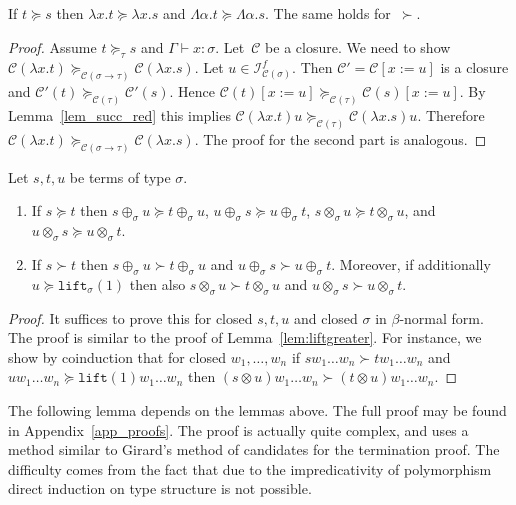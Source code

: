 \documentclass[a4paper,UKenglish,cleveref,autoref,numberwithinsect]{lipics-v2019}
\theoremstyle{definition}
\newcommand{\Iterms}{\mathcal{I}}
\newcommand{\arrtype}{\rightarrow}
\newcommand{\subst}[2]{#1:=#2}
\newcommand{\abs}[2]{\lambda #1.#2}
\newcommand{\tabs}[2]{\Lambda #1.#2}
\newcommand{\lift}{\mathtt{lift}}
\newcommand{\cl}{\mathcal{C}}
\newcommand{\proves}{\vdash}
\begin{document}
\begin{lemma}\label{lem_abs_succ}
  If $t \succeq s$ then $\abs{x}{t} \succeq \abs{x}{s}$ and
  $\tabs{\alpha}{t} \succeq \tabs{\alpha}{s}$. The same holds
  for~$\succ$.
\end{lemma}

\begin{proof}
  Assume $t \succeq_\tau s$ and $\Gamma \proves x : \sigma$. Let~$\cl$
  be a closure. We need to show $\cl(\abs{x}{t})
  \succeq_{\cl(\sigma\arrtype\tau)} \cl(\abs{x}{s})$. Let $u \in
  \Iterms^f_{\cl(\sigma)}$. Then $\cl' = \cl[\subst{x}{u}]$ is a
  closure and $\cl'(t) \succeq_{\cl(\tau)} \cl'(s)$. Hence
  $\cl(t)[\subst{x}{u}] \succeq_{\cl(\tau)} \cl(s)[\subst{x}{u}]$. By
  Lemma~\ref{lem_succ_red} this implies $\cl(\abs{x}{t}) u
  \succeq_{\cl(\tau)} \cl(\abs{x}{s}) u$. Therefore $\cl(\abs{x}{t})
  \succeq_{\cl(\sigma\arrtype\tau)} \cl(\abs{x}{s})$. The proof for
  the second part is analogous.
\end{proof}

\begin{lemma}\label{lem:plustimesmonotonic}
  Let $s,t,u$ be terms of type $\sigma$.
  \begin{enumerate}
  \item If $s \succeq t$ then $s \oplus_\sigma u \succeq t
    \oplus_\sigma u$, $u \oplus_\sigma s \succeq u \oplus_\sigma t$,
    $s \otimes_\sigma u \succeq t \otimes_\sigma u$, and $u
    \otimes_\sigma s \succeq u \otimes_\sigma t$.
  \item If $s \succ t$ then $s \oplus_\sigma u \succ t \oplus_\sigma
    u$ and $u \oplus_\sigma s \succ u \oplus_\sigma t$. Moreover, if
    additionally $u \succeq \lift_\sigma(1)$ then also $s
    \otimes_\sigma u \succ t \otimes_\sigma u$ and $u \otimes_\sigma s
    \succ u \otimes_\sigma t$.
  \end{enumerate}
\end{lemma}

\begin{proof}
  It suffices to prove this for closed $s,t,u$ and closed $\sigma$ in
  $\beta$-normal form. The proof is similar to the proof of
  Lemma~\ref{lem:liftgreater}. For instance, we show by coinduction
  that for closed $w_1,\ldots,w_n$ if $s w_1 \ldots w_n \succ t w_1
  \ldots w_n$ and $u w_1 \ldots w_n \succeq \lift(1) w_1 \ldots w_n$
  then $(s \otimes u) w_1 \ldots w_n \succ (t \otimes u) w_1 \ldots
  w_n$.
\end{proof}

The following lemma depends on the lemmas above. The full proof may be
found in Appendix~\ref{app_proofs}. The proof is actually quite
complex, and uses a method similar to Girard's method of candidates
for the termination proof. The difficulty comes from the fact that due
to the impredicativity of polymorphism direct induction on type
structure is not possible.
\end{document}

